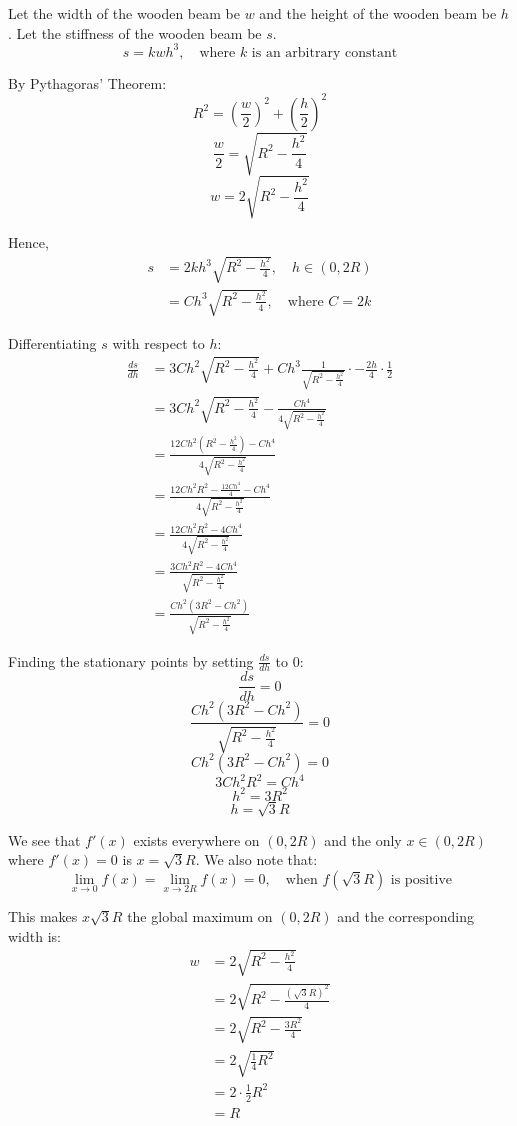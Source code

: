 \documentclass[11pt]{article}
\begin{document}
Let the width of the wooden beam be \(w\) and the height of the wooden beam be \(h\). Let the stiffness of the wooden beam be \(s\).
\[s = kwh^3, \quad \text{where } k \text{ is an arbitrary constant}\]

By Pythagoras' Theorem:
\[R^2 = \left( \frac{w}{2} \right)^2 + \left( \frac{h}{2} \right)^2\]
\[\frac{w}{2} = \sqrt{R^2 - \frac{h^2}{4}}\]
\[w = 2\sqrt{R^2 - \frac{h^2}{4}}\]

Hence,
\begin{align*}
s &= 2kh^3 \sqrt{R^2 - \frac{h^2}{4}}, \quad h \in (0, 2R) \\
&= Ch^3 \sqrt{R^2 - \frac{h^2}{4}}, \quad \text{where } C = 2k
\end{align*}

Differentiating \(s\) with respect to \(h\):
\begin{align*}
\frac{ds}{dh} &= 3Ch^2 \sqrt{R^2 - \frac{h^2}{4}} + Ch^3 \frac{1}{\sqrt{R^2 - \frac{h^2}{4}}} \cdot - \frac{2h}{4} \cdot \frac{1}{2} \\
&= 3Ch^2 \sqrt{R^2 - \frac{h^2}{4}} - \frac{Ch^4}{4\sqrt{R^2 - \frac{h^2}{4}}} \\
&= \frac{12Ch^2 \left( R^2 - \frac{h^2}{4} \right) - Ch^4}{4 \sqrt{R^2 - \frac{h^2}{4}}} \\
&= \frac{12Ch^2R^2 - \frac{12Ch^4}{4} - Ch^4}{4 \sqrt{R^2 - \frac{h^2}{4}}} \\
&= \frac{12Ch^2R^2 - 4Ch^4}{4 \sqrt{R^2 - \frac{h^2}{4}}} \\
&= \frac{3Ch^2R^2 - 4Ch^4}{\sqrt{R^2 - \frac{h^2}{4}}} \\
&= \frac{Ch^2(3R^2 - Ch^2)}{\sqrt{R^2 - \frac{h^2}{4}}}
\end{align*}

Finding the stationary points by setting \(\frac{ds}{dh}\) to \(0\):
\[\frac{ds}{dh} = 0\]
\[\frac{Ch^2(3R^2 - Ch^2)}{\sqrt{R^2 - \frac{h^2}{4}}} = 0\]
\[Ch^2(3R^2 - Ch^2) = 0\]
\[3Ch^2R^2 = Ch^4\]
\[h^2 = 3R^2\]
\[h = \sqrt{3}R\]

We see that \(f'(x)\) exists everywhere on \((0, 2R)\) and the only \(x \in (0, 2R)\) where \(f'(x) = 0\) is \(x = \sqrt{3}R\). We also note that:
\[\lim_{x \rightarrow 0} f(x) = \lim_{x \rightarrow 2R} f(x) = 0, \quad \text{when } f \left(\sqrt{3}R \right) \text{ is positive}\]

This makes \(x \sqrt{3}R\) the global maximum on \((0, 2R)\) and the corresponding width is:
\begin{align*}
w &= 2\sqrt{R^2 - \frac{h^2}{4}} \\
&= 2\sqrt{R^2 - \frac{\left(\sqrt{3}R \right)^2}{4}} \\
&= 2\sqrt{R^2 - \frac{3R^2}{4}} \\
&= 2\sqrt{\frac{1}{4} R^2} \\
&= 2 \cdot \frac{1}{2}R^2 \\
&= R
\end{align*}
\end{document}
